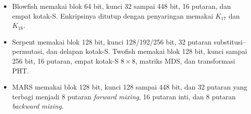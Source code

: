 \begin{itemize}
    $f(x)=x(2x+1)$, dan memakai empat register $A$, $B$, $C$, dan $D$.
    \item Blowfish memakai blok 64 bit, kunci 32 sampai 448 bit, 16 putaran, dan
    empat kotak-S. Enkripsinya ditutup dengan penyaringan memakai $K_{17}$ dan
    $K_{18}$.
    \item Serpent memakai blok 128 bit, kunci 128/192/256 bit, 32 putaran
    substitusi--permutasi, dan delapan kotak-S. Twofish memakai blok 128 bit,
    kunci sampai 256 bit, 16 putaran, empat kotak-S $8 \times 8$, matriks MDS,
    dan transformasi PHT.
    \item MARS memakai blok 128 bit, kunci 128 sampai 448 bit, dan 32 putaran
    yang terbagi menjadi 8 putaran \textit{forward mixing}, 16 putaran inti, dan
    8 putaran \textit{backward mixing}.
\end{itemize}
